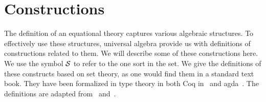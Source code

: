 \section{Constructions}
\label{sec:toBeGenerated}
The definition of an equational theory captures various algebraic structures. To effectively use these structures, universal algebra provide us with definitions of constructions related to them.  We will describe some of these constructions here. We use the symbol $\mathcal{S}$ to refer to the one sort in the set.
We give the definitions of these constructs based on set theory, as one would find them in a standard text book. They have been formalized in type theory in  both Coq in~\cite{capretta99, Spitters2010} and agda~\cite{Gunther2018Agda}. 
The definitions are adapted from~\cite{ehrig1985fundamentals} and~\cite{handbook1993Maibaum}.  

